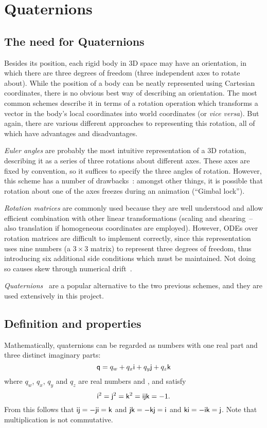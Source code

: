 \section{Quaternions\label{quaternions}}
\subsection{The need for Quaternions}
Besides its position, each rigid body in 3D space may have an orientation, in which there are
three degrees of freedom (three independent axes to rotate about).
While the position of a body can be neatly represented using Cartesian coordinates, there is
no obvious best way of describing an orientation. The most common schemes describe
it in terms of a rotation operation which transforms a vector in the body's local
coordinates into world coordinates (or \textsl{vice versa}). But again, there are various different
approaches to representing this rotation, all of which have advantages and disadvantages.

\emph{Euler angles} are probably the most intuitive representation of a 3D rotation, describing
it as a series of three rotations about different axes. These axes are fixed by convention, so it
suffices to specify the three angles of rotation. However, this scheme has a number of
drawbacks~\cite{Saunders:PhD,Shoemake:85}: amongst other things, it is possible that rotation
about one of the axes freezes during an animation (``Gimbal lock'').

\emph{Rotation matrices} are commonly used because they are well understood and
allow efficient combination with other linear transformations (scaling
and shearing~-- also translation if homogeneous coordinates are employed). However, ODEs over
rotation matrices are difficult to implement correctly, since this representation uses nine
numbers (a $3\times3$ matrix) to represent three degrees of freedom, thus introducing six
additional side conditions which must be maintained. Not doing so causes skew through numerical
drift~\cite{Saunders:PhD}.

\emph{Quaternions}~\cite{Shoemake:85,Eberly:01,MathWorld:Quaternion} are a popular alternative
to the two previous sche\-mes, and they are used extensively in this project.

\subsection{Definition and properties}
Mathematically, quaternions can be regarded as numbers with one real part and three
distinct imaginary parts:
\begin{equation}
\mathsf{q} = q_w + q_x\mathsf{i} + q_y\mathsf{j} + q_z\mathsf{k}
\end{equation}
where $q_w$, $q_x$, $q_y$ and $q_z$ are real numbers and \qi{}, \qj{} and \qk{} satisfy
\begin{equation}
\mathsf{i}^2 = \mathsf{j}^2 = \mathsf{k}^2 = \mathsf{i}\mathsf{j}\mathsf{k} = -1.
\end{equation}
From this follows that
$\mathsf{i}\mathsf{j} = -\mathsf{j}\mathsf{i} = \mathsf{k}$ and
$\mathsf{j}\mathsf{k} = -\mathsf{k}\mathsf{j} = \mathsf{i}$ and
$\mathsf{k}\mathsf{i} = -\mathsf{i}\mathsf{k} = \mathsf{j}$.
Note that multiplication is not commutative.

